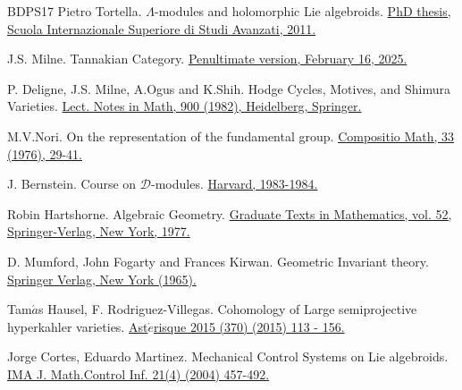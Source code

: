 \documentclass[12pt,reqno]{amsart}
\numberwithin{equation}{subsection}
\theoremstyle{definition}
\theoremstyle{theorem}
\begin{document}
\begin{thebibliography}{BDPS17}
	\newblock Pietro Tortella.
	\newblock $\Lambda$-modules and holomorphic Lie algebroids.
	\newblock  \href{https://iris.sissa.it/retrieve/dd8a4bf7-0696-20a0-e053-d805fe0a8cb0/1963_6243_PhD_Tortella_Pietro.pdf}{PhD thesis, Scuola Internazionale Superiore di Studi Avanzati, 2011.}
	
	\newblock J.S. Milne.
	\newblock Tannakian Category.
	\newblock \href{https://jmilne.org/math/Books/tcdraft.pdf}{Penultimate version, February 16, 2025.}
	
	\newblock P. Deligne, J.S. Milne, A.Ogus and K.Shih.
	\newblock Hodge Cycles, Motives, and Shimura Varieties.
	\newblock \href{https://link.springer.com/book/10.1007/978-3-540-38955-2}{Lect. Notes in Math, 900 (1982), Heidelberg, Springer.}
	
	\newblock M.V.Nori.
	\newblock On the representation of the fundamental group.
	\newblock \href{https://eudml.org/doc/89294}{Compositio Math, 33 (1976), 29-41.}
	
	\newblock J. Bernstein.
	\newblock Course on $\mathscr{D}$-modules.
	\newblock \href{https://www.math.columbia.edu/~khovanov/resources/Bernstein-dmod.pdf}{Harvard, 1983-1984.}
	
	\newblock Robin Hartshorne.
	\newblock Algebraic Geometry.
	\newblock \href{https://link.springer.com/book/10.1007/978-1-4757-3849-0}{Graduate Texts in Mathematics, vol. 52, Springer-Verlag, New York, 1977.}
	
	\newblock D. Mumford, John Fogarty and Frances Kirwan.
	\newblock Geometric Invariant theory.
	\newblock \href{https://link.springer.com/book/9783642634000}{Springer Verlag, New York (1965).}
	
	\newblock Tam$\acute{a}$s Hausel, F. Rodriguez-Villegas.
	\newblock Cohomology of Large semiprojective hyperkahler varieties.
	\newblock \href{https://hausel.pages.ist.ac.at/wp-content/uploads/sites/229/2024/08/large.pdf}{Ast$\acute{e}$risque 2015 (370) (2015) 113 - 156.}
	
	\newblock Jorge Cortes, Eduardo Martinez. 
	\newblock Mechanical Control Systems on Lie algebroids.
	\newblock \href{https://academic.oup.com/imamci/article-abstract/21/4/457/723154?redirectedFrom=fulltext}{IMA J. Math.Control Inf. 21(4) (2004) 457-492.}
	

\end{thebibliography}
\end{document}
